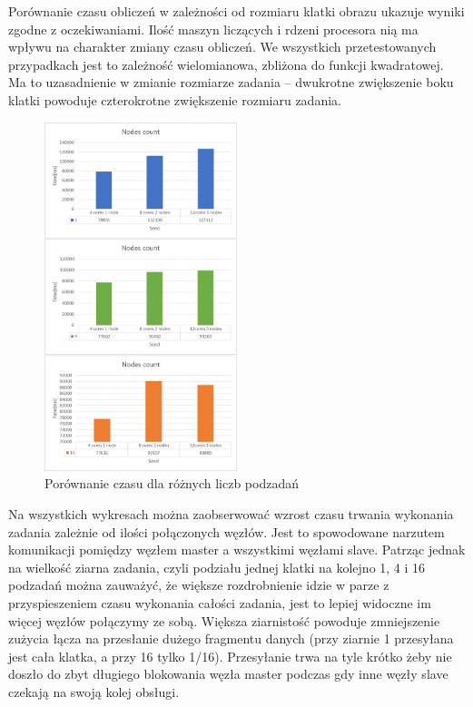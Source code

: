 \documentclass[a4paper]{article}
\begin{document}
Porównanie czasu obliczeń w zależności od rozmiaru klatki obrazu ukazuje wyniki zgodne z oczekiwaniami. Ilość maszyn liczących i rdzeni procesora nią ma wpływu na charakter zmiany czasu obliczeń. We wszystkich przetestowanych przypadkach jest to zależność wielomianowa, zbliżona do funkcji kwadratowej. Ma to uzasadnienie w zmianie rozmiarze zadania – dwukrotne zwiększenie boku klatki powoduje czterokrotne zwiększenie rozmiaru zadania.

\begin{figure}[H]
    \centering
    \includegraphics[width=0.5\textwidth]{3.png}
    \caption{Porównanie czasu dla różnych liczb podzadań}
    \label{fig:my_frac}
\end{figure}

Na wszystkich wykresach można zaobserwować wzrost czasu trwania wykonania zadania zależnie od ilości połączonych węzłów. Jest to spowodowane narzutem komunikacji pomiędzy węzłem master a wszystkimi węzłami slave. Patrząc jednak na wielkość ziarna zadania, czyli podziału jednej klatki na kolejno 1, 4 i 16 podzadań można zauważyć, że większe rozdrobnienie idzie w parze z przyspieszeniem czasu wykonania całości zadania, jest to lepiej widoczne im więcej węzłów połączymy ze sobą. Większa ziarnistość powoduje zmniejszenie zużycia łącza na przesłanie dużego fragmentu danych (przy ziarnie 1 przesyłana jest cała klatka, a przy 16 tylko 1/16). Przesyłanie trwa na tyle krótko żeby nie doszło do zbyt długiego blokowania węzła master podczas gdy inne węzły slave czekają na swoją kolej obsługi.
\end{document}
